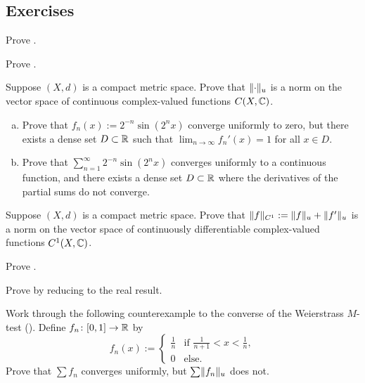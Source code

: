 \subsection{Exercises}

\begin{exercise}
Prove .
\end{exercise}

\begin{exercise}
Prove .
\end{exercise}

\begin{exercise}
Suppose $(X,d)$ is a compact metric space.
Prove that $\lVert {\cdot} \rVert_u$ is a norm on the vector space of
continuous complex-valued functions $C(X,{\mathbb{C}})$.
\end{exercise}

\begin{exercise}
\leavevmode
\begin{enumerate}[a)]
\item
Prove that
$f_n(x) := 2^{-n} \sin(2^n x)$
converge uniformly to zero, but there exists a dense set $D \subset {\mathbb{R}}$
such that $\lim_{n\to\infty} f_n'(x) = 1$ for all $x \in D$.
\item
Prove that
$\sum_{n=1}^\infty 2^{-n} \sin(2^n x)$
converges uniformly to a continuous function,
and there exists a dense set $D \subset {\mathbb{R}}$
where the derivatives of the partial sums do not converge.
\end{enumerate}
\end{exercise}

\begin{exercise}
Suppose $(X,d)$ is a compact metric space.
Prove that $\lVert {f} \rVert_{C^1} := \lVert {f} \rVert_u+\lVert {f'} \rVert_u$
is a norm on the vector space of
continuously differentiable complex-valued functions $C^1(X,{\mathbb{C}})$.
\end{exercise}

\begin{exercise}
Prove .
\end{exercise}

\begin{exercise}
Prove  by reducing to the real
result.
\end{exercise}

\begin{exercise}
Work through the following counterexample to the converse of
the Weierstrass $M$-test ().  Define
$f_n \colon [0,1] \to {\mathbb{R}}$ by
\begin{equation*}
f_n(x) :=
\begin{cases}
\frac{1}{n} & \text{if } \frac{1}{n+1} < x < \frac{1}{n},\\
0	    & \text{else.}
\end{cases}
\end{equation*}
Prove that $\sum f_n$ converges uniformly, but $\sum \lVert {f_n} \rVert_u$
does not.
\end{exercise}

